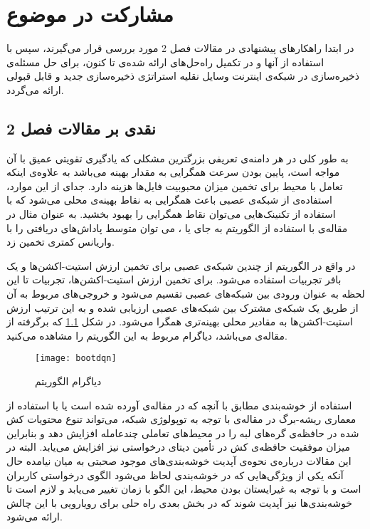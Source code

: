 \chapter{مشارکت در موضوع}

در ابتدا راهکارهای پیشنهادی در مقالات فصل 2 مورد بررسی قرار می‌گیرند، سپس با استفاده از آنها و در تکمیل راه‌حل‌های ارائه شده‌ی تا کنون، برای حل مسئله‌ی ذخیره‌سازی در شبکه‌ی اینترنت وسایل نقلیه استراتژی ذخیره‌سازی جدید و قابل قبولی ارائه می‌گردد. 

\section{نقدی بر مقالات فصل 2}
به طور کلی در هر دامنه‌ی تعریفی بزرگترین مشکلی که ‌یادگیری تقویتی عمیق با آن مواجه است، پایین بودن سرعت همگرایی به مقدار بهینه می‌باشد به علاوه‌ی اینکه تعامل با محیط برای تخمین میزان محبوبیت فایل‌ها هزینه دارد. جدای از این موارد، استفاده‌ی از شبکه‌ی عصبی باعث همگرایی به نقاط بهینه‌ی محلی می‌شود که با استفاده از تکنینک‌هایی می‌توان نقاط همگرایی را بهبود بخشید. به عنوان مثال در مقاله‌ی \cite{wu2021caching} با استفاده از الگوریتم  به جای  یا ، می توان متوسط پاداش‌های دریافتی را با واریانس کمتری تخمین زد. 

در واقع در الگوریتم  از چندین شبکه‌ی عصبی برای تخمین ارزش استیت-اکشن‌ها و یک بافر تجربیات استفاده می‌شود. برای تخمین ارزش استیت-اکشن‌ها، تجربیات تا این لحظه به عنوان ورودی بین شبکه‌های عصبی تقسیم می‌شود و خروجی‌های مربوط به آن از طریق یک شبکه‌ی مشترک بین شبکه‌های عصبی ارزیابی شده و به این ترتیب ارزش استیت-اکشن‌ها به مقادیر محلی بهینه‌تری همگرا می‌شود. در شکل \ref{fig:bootstrappeddqn} که برگرفته از مقاله‌ی \cite{osband2016deep} می‌باشد، دیاگرام مربوط به این الگوریتم را مشاهده می‌کنید.

\begin{figure}[ht]
	\centerline{\texttt{[image: bootdqn]}}
	\caption{دیاگرام الگوریتم }
	\label{fig:bootstrappeddqn}
\end{figure}

\newpage
استفاده از خوشه‌بندی مطابق با آنچه که در مقاله‌ی \cite{majidi2021hfdrl} آورده شده است یا با استفاده از معماری ریشه-برگ در مقاله‌ی \cite{wu2022deep} با توجه به توپولوژی شبکه، می‌تواند تنوع محتویات کش شده در حافظه‌ی گره‌های لبه را در محیط‌های تعاملی چندعامله افزایش دهد و بنابراین میزان موفقیت حافظه‌ی کش در تأمین دیتای درخواستی نیز افزایش می‌یابد. البته در این مقالات درباره‌ی نحوه‌ی آپدیت خوشه‌بندی‌های موجود صحبتی به میان نیامده حال آنکه یکی از ویژگی‌هایی که در خوشه‌بندی لحاظ می‌شود الگوی درخواستی کاربران است و با توجه به غیرایستان بودن محیط، این الگو با زمان تغییر می‌یابد و لازم است تا خوشه‌بندی‌ها نیز آپدیت شوند که در بخش بعدی راه حلی برای رویارویی با این چالش ارائه می‌شود.

